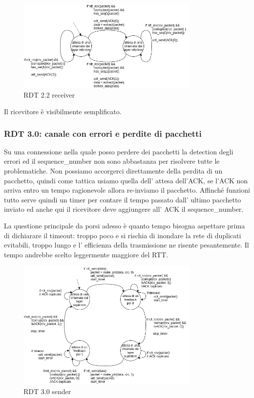 \begin{figure}[H]
    \centering
    \includegraphics[width=340px]{images/3_Reti_connessione_diretta/rdt_2.2_receiver.png}
    \caption{RDT 2.2 receiver}
\end{figure}
Il ricevitore è visibilmente semplificato.

\subsubsection{RDT 3.0: canale con errori e perdite di pacchetti}
Su una connessione nella quale posso perdere dei pacchetti la detection degli errori ed il sequence\_number non sono abbastanza per risolvere tutte le problematiche.
Non possiamo accorgerci direttamente della perdita di un pacchetto, quindi come tattica usiamo quella dell' attesa dell'ACK, se l'ACK non arriva entro un tempo ragionevole allora re-inviamo il pacchetto.
Affinché funzioni tutto serve quindi un timer per contare il tempo passato dall' ultimo pacchetto inviato ed anche qui il ricevitore deve aggiungere all' ACK il sequence\_number.

La questione principale da porsi adesso è quanto tempo bisogna aspettare prima di dichiarare il timeout: troppo poco e si rischia di inondare la rete di duplicati evitabili, troppo lungo e l' efficienza della trasmissione ne risente pesantemente.
Il tempo andrebbe scelto leggermente maggiore del RTT.
\begin{figure}[H]
    \centering
    \includegraphics[width=340px]{images/3_Reti_connessione_diretta/rdt_3.0_sender.png}
    \caption{RDT 3.0 sender}
\end{figure}

